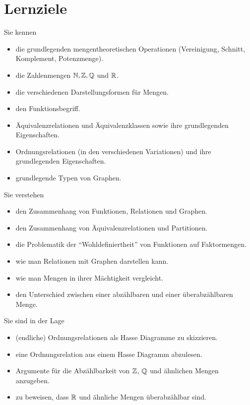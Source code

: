 \section*{Lernziele}
Sie kennen
\begin{itemize}
\item die grundlegenden mengentheoretischen Operationen (Vereinigung, Schnitt, Komplement, Potenzmenge).
\item die Zahlenmengen $\mathbb{N},\mathbb{Z},\mathbb{Q}$ und $\mathbb{R}$.
\item die verschiedenen Darstellungsformen für Mengen.
\item den Funktionsbegriff.
\item Äquivalenzrelationen und Äquivalenzklassen sowie ihre grundlegenden Eigenschaften.
\item Ordnungsrelationen (in den verschiedenen Variationen) und ihre grundlegenden
Eigenschaften.
\item grundlegende Typen von Graphen.
\end{itemize}
Sie verstehen
\begin{itemize}
\item den Zusammenhang von Funktionen, Relationen und Graphen.
\item den Zusammenhang von Äquivalenzrelationen und Partitionen.
\item die Problematik der ``Wohldefiniertheit'' von Funktionen auf Faktormengen.
\item wie man Relationen mit Graphen darstellen kann.
\item wie man Mengen in ihrer Mächtigkeit vergleicht.
\item den Unterschied zwischen einer abzählbaren und einer überabzählbaren Menge.
\end{itemize}
Sie sind in der Lage
\begin{itemize}
\item (endliche) Ordnungsrelationen als Hasse Diagramme zu skizzieren.
\item eine Ordnungsrelation aus einem Hasse Diagramm abzulesen.
\item Argumente für die Abzählbarkeit von $\mathbb{Z}$, $\mathbb{Q}$ und ähnlichen Mengen anzugeben.
\item zu beweisen, dass $\mathbb{R}$ und ähnliche Mengen überabzählbar sind.
\end{itemize}


